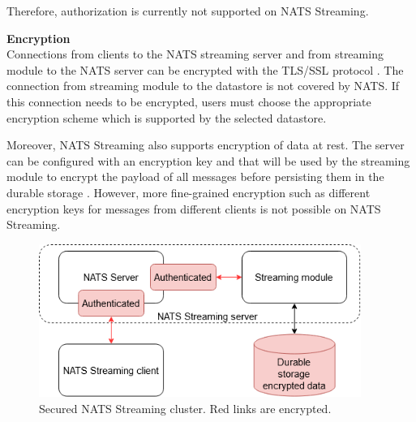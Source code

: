 Therefore, authorization is currently not supported on NATS Streaming. 

\textbf{Encryption}\\
Connections from clients to the NATS streaming server and from streaming module to the NATS server can be encrypted with the TLS/SSL protocol \cite{normalnatsconfig}. The connection from streaming module to the datastore is not covered by NATS. If this connection needs to be encrypted, users must choose the appropriate encryption scheme which is supported by the selected datastore.

Moreover, NATS Streaming also supports encryption of data at rest. The server can be configured with an encryption key and that will be used by the streaming module to encrypt the payload of all messages before persisting them in the durable storage \cite{natstoreencryption}. However, more fine-grained encryption such as different encryption keys for messages from different clients is not possible on NATS Streaming.
\begin{figure}[h]
	\centering
	\includegraphics[width=10.5cm]{images/security-nats.png}
	\caption{Secured NATS Streaming cluster. Red links are encrypted.}
	\label{fig:securitynats}
\end{figure}
